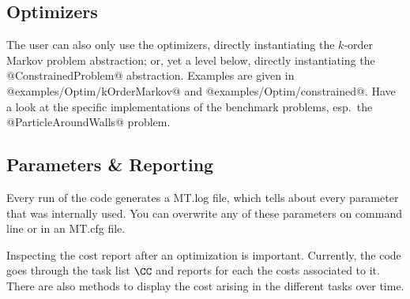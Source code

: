 \documentclass[10pt,fleqn,twoside]{article}
\begin{document}
\subsection{Optimizers}

The user can also only use the optimizers, directly instantiating the
$k$-order Markov problem abstraction; or, yet a level below, directly
instantiating the @ConstrainedProblem@ abstraction. Examples are given
in @examples/Optim/kOrderMarkov@ and
@examples/Optim/constrained@. Have a look at the specific
implementations of the benchmark problems, esp.\ the
@ParticleAroundWalls@ problem.

\subsection{Parameters \& Reporting}

Every run of the code generates a MT.log file, which tells about every
parameter that was internally used. You can overwrite any of these
parameters on command line or in an MT.cfg file.

Inspecting the cost report after an optimization is
important. Currently, the code goes through the task list $\CC$ and
reports for each the costs associated to it. There are also methods to
display the cost arising in the different tasks over time.







\end{document}
